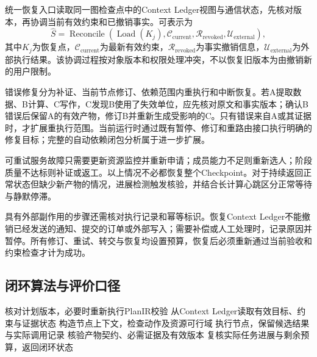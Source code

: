 统一恢复入口读取同一图检查点中的Context Ledger视图与通信状态，先核对版本，再协调当前有效约束和已撤销事实。可表示为
\begin{equation}
\widehat{S}=\operatorname{Reconcile}
\left(\operatorname{Load}(K_j),\mathcal{C}_{\mathrm{current}},
\mathcal{R}_{\mathrm{revoked}},\mathcal{U}_{\mathrm{external}}\right),
\label{eq:safety_reconcile}
\end{equation}
其中$K_j$为恢复点，$\mathcal{C}_{\mathrm{current}}$为最新有效约束，$\mathcal{R}_{\mathrm{revoked}}$为事实撤销信息，$\mathcal{U}_{\mathrm{external}}$为外部执行结果。该协调过程按对象版本和权限处理冲突，不以恢复旧版本为由撤销新的用户限制。

错误修复分为补证、当前节点修订、依赖范围内重执行和中断恢复。若A提取数据、B计算、C写作，C发现B使用了失效单位，应先核对原文和事实版本；确认B错误后保留A的有效产物，修订B并重新生成受影响的C。只有错误来自A或其证据时，才扩展重执行范围。当前运行时通过既有暂停、修订和重路由接口执行明确的修复目标；完整的自动依赖闭包分析属于进一步扩展。

可重试服务故障只需要更新资源监控并重新申请；成员能力不足则重新选人；阶段质量不达标则补证或返工。以上情况不必都恢复整个Checkpoint。对于持续返回正常状态但缺少新产物的情况，进展检测触发核验，并结合长计算心跳区分正常等待与静默停滞。

具有外部副作用的步骤还需核对执行记录和幂等标识。恢复Context Ledger不能撤销已经发送的通知、提交的订单或外部写入；需要补偿或人工处理时，记录原因并暂停。所有修订、重试、转交与恢复均设置预算，恢复后必须重新通过当前验收和约束检查才计为成功。

\subsection{闭环算法与评价口径}

\begin{algorithm}[htbp]
\caption{幻觉抑制与安全执行闭环}
\label{alg:safety_execution_loop}
核对计划版本，必要时重新执行PlanIR校验\;
从Context Ledger读取有效目标、约束与证据状态\;
构造节点上下文，检查动作及资源可行域\;
执行节点，保留候选结果与实际调用记录\;
核验产物契约、必需证据及有效版本\;
复核实际任务进展与剩余预算，返回闭环状态\;
\end{algorithm}

